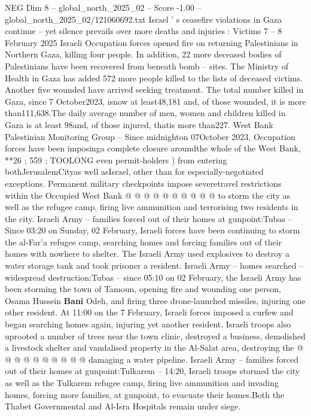 \begin{textsample}{NEG Dim 8 – global\_north\_2025\_02 – Score -1.00 – global\_north\_2025\_02/121060692.txt}  \label{ex:f8_neg_141}
Israel ' s ceasefire violations in Gaza continue -- yet silence prevails over more deaths and injuries : Victims 7 -- 8 February 2025 Israeli Occupation forces opened fire on returning Palestinians in Northern Gaza, killing four people.
In addition, 22 more deceased bodies of Palestinians have been recovered from beneath bomb -- sites.
The Ministry of Health in Gaza has added 572 more people killed to the lists of deceased victims.
Another five wounded have arrived seeking treatment.
The total number killed in Gaza, since 7 October2023, isnow at least48,181 and, of those wounded, it is more than111,638.The daily average number of men, women and children killed in Gaza is at least 98and, of those injured, thatis more than227.
West Bank Palestinian Monitoring Group -- Since midnighton 07October 2023, Occupation forces have been imposinga complete closure aroundthe whole of the West Bank, **26 ; 559 ; TOOLONG even permit-holders ) from entering bothJerusalemCityas well asIsrael, other than for especially-negotiated exceptions.
Permanent military checkpoints impose severetravel restrictions within the Occupied West Bank @ @ @ @ @ @ @ @ @ @ to storm the city as well as the refugee camp, firing live ammunition and terrorising two residents in the city.
Israeli Army -- families forced out of their homes at gunpoint:Tubas -- Since 03:20 on Sunday, 02 February, Israeli forces have been continuing to storm the al-Far'a refugee camp, searching homes and forcing families out of their homes with nowhere to shelter.
The Israeli Army used explosives to destroy a water storage tank and took prisoner a resident.
Israeli Army -- homes searched -- widespread destruction:Tubas -- since 05:10 on 02 February, the Israeli Army has been storming the town of Tamoun, opening fire and wounding one person, Osama Hussein \textbf{Bani} Odeh, and firing three drone-launched missiles, injuring one other resident.
At 11:00 on the 7 February, Israeli forces imposed a curfew and began searching homes again, injuring yet another resident.
Israeli troops also uprooted a number of trees near the town clinic, destroyed a business, demolished a livestock shelter and vandalised property in the Al-Salat area, destroying the @ @ @ @ @ @ @ @ @ @ damaging a water pipeline.
Israeli Army -- families forced out of their homes at gunpoint:Tulkarem -- 14:20, Israeli troops stormed the city as well as the Tulkarem refugee camp, firing live ammunition and invading homes, forcing more families, at gunpoint, to evacuate their homes.Both the Thabet Governmental and Al-Isra Hospitals remain under siege.

\end{textsample}
